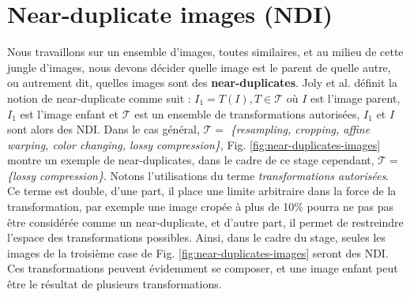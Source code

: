 \documentclass[utf8]{stageM2R} %
\begin{document}
\section{Near-duplicate images (NDI)}
\label{subsec:ndi}
Nous travaillons sur un ensemble d'images, toutes similaires, et au milieu de cette jungle d'images, nous devons décider quelle image est le parent de quelle autre, ou autrement dit, quelles images sont des \textbf{near-duplicates}. Joly et al. \cite{joly2007content} définit la notion de near-duplicate comme suit : $I_{1} = T(I), T \in \mathcal{T}$ où $I$ est l'image parent, $I_{1}$ est l'image enfant et $\mathcal{T}$ est un ensemble de transformations autorisées, $I_{1}$ et $I$ sont alors des NDI. Dans le cas général, $\mathcal{T} = $ \textit{\{resampling, cropping, affine warping, color changing, lossy compression\}}, Fig. \ref{fig:near-duplicates-images} montre un exemple de near-duplicates, dans le cadre de ce stage cependant, $\mathcal{T} = $ \textit{\{lossy compression\}}. Notons l'utilisations du terme \textit{transformations autorisées}. Ce terme est double, d'une part, il place une limite arbitraire dans la force de la transformation, par exemple une image cropée à plus de 10\% pourra ne pas pas être considérée comme un near-duplicate, et d'autre part, il permet de restreindre l'espace des transformations possibles. Ainsi, dans le cadre du stage, seules les images de la troisième case de Fig. \ref{fig:near-duplicates-images} seront des NDI. Ces transformations peuvent évidemment se composer, et une image enfant peut être le résultat de plusieurs transformations.
\end{document}
